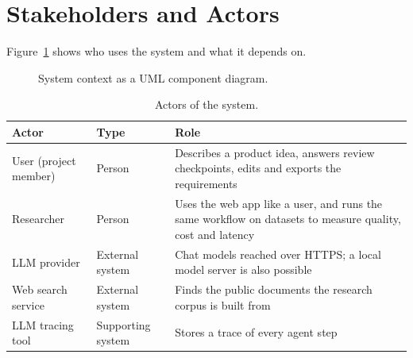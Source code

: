 \section{Stakeholders and Actors}
\label{sec:sd-actors}

Figure~\ref{fig:sd-context} shows who uses the system and what it depends on.

\begin{figure}[H]
    \centering
    \resizebox{\linewidth}{!}{}
    \caption{System context as a UML component diagram.}
    \label{fig:sd-context}
\end{figure}

\begin{table}[H]
    \centering
    \caption{Actors of the system.}
    \label{tab:sd-actors}
    \begin{tabularx}{\linewidth}{|l|l|X|}
        \hline
        \textbf{Actor} & \textbf{Type} & \textbf{Role} \\
        \hline
        User (project member) & Person & Describes a product idea, answers review checkpoints, edits and exports the requirements \\
        Researcher & Person & Uses the web app like a user, and runs the same workflow on datasets to measure quality, cost and latency \\
        LLM provider & External system & Chat models reached over HTTPS; a local model server is also possible \\
        Web search service & External system & Finds the public documents the research corpus is built from \\
        LLM tracing tool & Supporting system & Stores a trace of every agent step \\
        \hline
    \end{tabularx}
\end{table}
